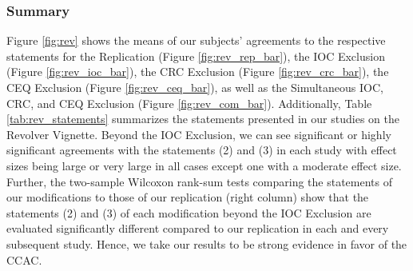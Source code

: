 \documentclass[egregdoesnotlikesansseriftitles,12pt]{scrartcl}
\begin{document}
\subsubsection{Summary}\label{sec:results_rev_sum}
Figure \ref{fig:rev} shows the means of our subjects' agreements to the respective statements for the Replication (Figure \ref{fig:rev_rep_bar}), the IOC Exclusion (Figure \ref{fig:rev_ioc_bar}), the CRC Exclusion (Figure \ref{fig:rev_crc_bar}), the CEQ Exclusion (Figure \ref{fig:rev_ceq_bar}), as well as the Simultaneous IOC, CRC, and CEQ Exclusion (Figure \ref{fig:rev_com_bar}). Additionally, Table \ref{tab:rev_statements} summarizes the statements presented in our studies on the Revolver Vignette. Beyond the IOC Exclusion, we can see significant or highly significant agreements with the statements (2) and (3) in each study with effect sizes being large or very large in all cases except one with a moderate effect size. Further, the two-sample Wilcoxon rank-sum tests comparing the statements of our modifications to those of our replication (right column) show that the statements (2) and (3) of each modification beyond the IOC Exclusion are evaluated significantly different compared to our replication in each and every subsequent study. Hence, we take our results to be strong evidence in favor of the CCAC. 
\end{document}
